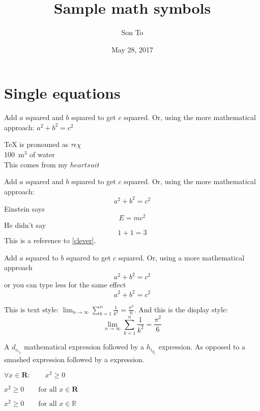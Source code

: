 \documentclass[a4paper,11pt]{report}
\author{Son To}
\title{Sample math symbols}
\date{May 28, 2017}
\begin{document}
\maketitle
\tableofcontents
\chapter{Single equations}
Add $a$ squared and $b$ squared to get $c$ squared. Or,
using the more mathematical approach:
$a^2 + b^2 = c^2$ %

\TeX{} is pronouned as $\tau\epsilon\chi$\\[5pt] %
100~m$^3$ of water\\[5pt]
This comes from my $heartsuit$

Add $a$ squared and $b$ squared to get $c$ squared. Or,
using the more mathematical approach:
\begin{equation}
  a^2 + b^2 = c^2 %
\end{equation}
Einstein says
\begin{equation}
  E = mc^2 \label{clever}
\end{equation}
He didn't say
\begin{equation}
  1 + 1 = 3 \tag{bollocks}
\end{equation}
This is a reference to \eqref{clever}.

Add $a$ squared to $b$ squared to get $c$ squared. Or, using
a more mathematical approach
\begin{equation*}
  a^2 + b^2 = c^2
\end{equation*}
or you can type less for the same effect
\[ a^2 + b^2 = c^2 \]

This is text style: $\lim_{n \to \infty}
\sum_{k=1}^n \frac{1}{k^2} = \frac{\pi^2}{6}$.
And this is the display style:
\begin{equation}
  \lim_{n \to \infty} \sum_{k=1}^n \frac{1}{k^2}
  = \frac{\pi^2}{6}
\end{equation}

A $d_{e_{e_p}}$ mathematical expression followed
by a $h_{i_{g_h}}$ expression. As opposed to a smashed
 expression followed by a
 expression.

$\forall x \in \mathbf{R}: \qquad x^2 \geq 0$

$x^{2} \geq 0 \qquad \text{for all } x \in \mathbf{R}$

$x^{2} \geq 0 \qquad \text{for all } x \in \mathbb{R}$
\end{document}
